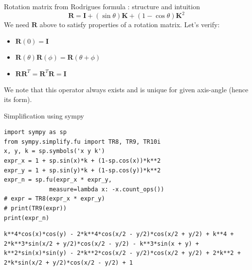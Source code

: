 \documentclass[presentation]{beamer}
\newcommand{\bv}[1]{\ensuremath{\mathbf{#1}}}
\begin{document}
\begin{frame}[label={sec:org1d6a4a0}]{Rotation matrix from Rodrigues formula : structure and intuition}
 \[ \mathbf {R} =\mathbf {I} +(\sin \theta )\mathbf {K} +(1-\cos \theta )\mathbf {K} ^{2} \]
We need \(\bv{R}\) above to satisfy properties of a rotation matrix. Let's verify:
\begin{itemize}
\item \(\bv{R}(0) = \bv{I}\)
\item \(\bv{R}(\theta)\bv{R}(\phi) = \bv{R}(\theta+\phi)\)
\item \(\bv{R}\bv{R}^T = \bv{R}^T\bv{R} = \bv{I}\)
\end{itemize}
We note that this operator always exists and is unique for given axis-angle
(hence its form).
\end{frame}
\begin{frame}[label={sec:orgae51bd3},fragile]{Simplification using sympy}
 \begin{verbatim}
import sympy as sp
from sympy.simplify.fu import TR8, TR9, TR10i
x, y, k = sp.symbols('x y k')
expr_x = 1 + sp.sin(x)*k + (1-sp.cos(x))*k**2
expr_y = 1 + sp.sin(y)*k + (1-sp.cos(y))*k**2
expr_n = sp.fu(expr_x * expr_y,
             measure=lambda x: -x.count_ops())
# expr = TR8(expr_x * expr_y)
# print(TR9(expr))
print(expr_n)
\end{verbatim}

\begin{verbatim}
k**4*cos(x)*cos(y) - 2*k**4*cos(x/2 - y/2)*cos(x/2 + y/2) + k**4 + 2*k**3*sin(x/2 + y/2)*cos(x/2 - y/2) - k**3*sin(x + y) + k**2*sin(x)*sin(y) - 2*k**2*cos(x/2 - y/2)*cos(x/2 + y/2) + 2*k**2 + 2*k*sin(x/2 + y/2)*cos(x/2 - y/2) + 1
\end{verbatim}
\end{frame}
\end{document}
